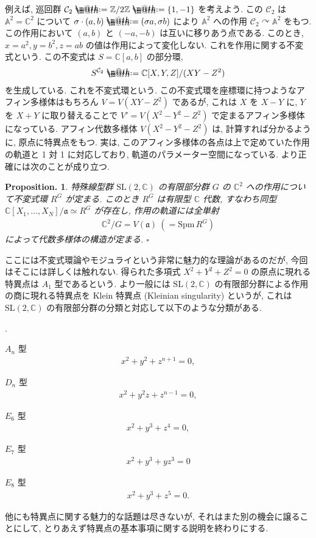 \documentclass[openany, a4paper, oneside]{jsbook}
\makeatletter
\newcounter{enum2}
\renewenvironment{enumerate}{%
\begin{list}%
{%
\arabic{enum2}.\ \,%
}%
{%
\usecounter{enum2}
\setlength{\itemindent}{0pt}%
\setlength{\leftmargin}{15pt}%
\setlength{\rightmargin}{0pt}%
\setlength{\labelsep}{0pt}%
\setlength{\labelwidth}{6pt}%
\setlength{\itemsep}{0pt}%
\setlength{\parsep}{0pt}%
\setlength{\listparindent}{0pt}%
}
}{%
\end{list}%
}
\newcommand*{\defeq}{\mathrel{\rlap{%
\raisebox{0.3ex}{$\m@th\cdot$}}%
\raisebox{-0.3ex}{$\m@th\cdot$}}%
=}
\theoremstyle{break}
\newtheorem{prop}[thm]{Proposition.}
\theoremstyle{breakdefn}
\newcommand{\cbk}[1]{\left\{#1\right\}}
\newcommand{\fin}{\hfill $\square$ \par}
\makeatother
\begin{document}
例えば, 巡回群 $\mathcal{C}_2 \defeq \mathbb{Z} / 2\mathbb{Z} \defeq \cbk{1, -1}$ を考えよう.
この $\mathcal{C}_2$ は $\mathbb{A}^2 = \mathbb{C}^2$ について
$\sigma \cdot (a,b) \defeq (\sigma a, \sigma b)$ により $\mathbb{A}^2$ への作用
$\mathcal{C}_2 \curvearrowright \mathbb{A}^2$ をもつ.
この作用において $(a,b)$ と $(-a,-b)$ は互いに移りあう点である.
このとき, $x=a^2, y=b^2, z=ab$ の値は作用によって変化しない.
これを作用に関する不変式という.
この不変式は $S=\mathbb{C}[a,b]$ の部分環,
\begin{align}
 S^{\mathcal{C}_2}
 \defeq
 \mathbb{C}[X,Y,Z]/ (XY-Z^2)
\end{align}
を生成している.
これを不変式環という.
この不変式環を座標環に持つようなアフィン多様体はもちろん $V=V (XY-Z^2)$ であるが,
これは $X$ を $X-Y$ に, $Y$ を $X+Y$ に取り替えることで $V'=V (X^2-Y^2-Z^2)$ で定まるアフィン多様体になっている.
アフィン代数多様体 $V (X^2-Y^2-Z^2)$ は, 計算すれば分かるように, 原点に特異点をもつ.
実は, このアフィン多様体の各点は上で定めていた作用の軌道と 1 対 1 に対応しており, 軌道のパラメーター空間になっている.
より正確には次のことが成り立つ.
\begin{prop}
 特殊線型群 $\mathrm{SL}(2,\mathbb{C})$ の有限部分群 $G$ の $\mathbb{C}^2$ への作用について不変式環 $R^G$ が定まる.
 このとき $R^G$ は有限型 $\mathbb{C}$ 代数,
 すなわち同型 $\mathbb{C}[X_1,\dots,X_N]/\mathfrak{a} \simeq R^G$ が存在し,
 作用の軌道には全単射
 \begin{align}
  \mathbb{C}^2/G
  =
  V (\mathfrak{a}) ~ (= \mathrm{Spm}\,R^G )
 \end{align}
 によって代数多様体の構造が定まる. \fin
\end{prop}
ここには不変式環論やモジュライという非常に魅力的な理論があるのだが, 今回はそこには詳しくは触れない.
得られた多項式 $X^2+Y^2+Z^2=0$ の原点に現れる特異点は $A_1$ 型であるという.
より一般には $\mathrm{SL}(2,\mathbb{C})$ の有限部分群による作用の商に現れる特異点を
Klein 特異点 (Kleinian singularity) というが,
これは $\mathrm{SL}(2,\mathbb{C})$ の有限部分群の分類と対応して以下のような分類がある.
\begin{enumerate}
\item $A_n$ 型
   \begin{align}
    x^2 + y^2 + z^{n+1} = 0,
   \end{align}
\item $D_n$ 型
   \begin{align}
    x^2 + y^2z + z^{n-1} = 0,
   \end{align}
\item $E_6$ 型
   \begin{align}
    x^2+y^3+z^4=0,
   \end{align}
\item $E_7$ 型
   \begin{align}
    x^2+y^3+yz^3=0
   \end{align}
\item $E_8$ 型
   \begin{align}
    x^2+y^3+z^5=0.
   \end{align}
\end{enumerate}
他にも特異点に関する魅力的な話題は尽きないが,
それはまた別の機会に譲ることにして, とりあえず特異点の基本事項に関する説明を終わりにする.
\end{document}
